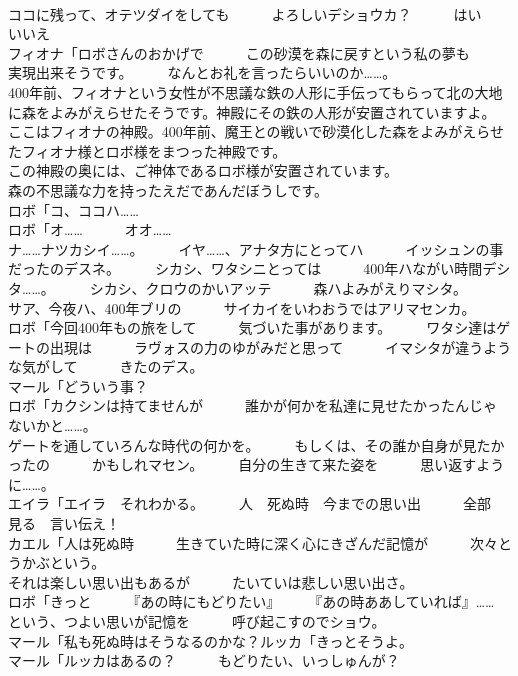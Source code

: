 \documentclass[8pt]{extreport}
\begin{document}
\begin{CJK}{UTF8}{min}
\\	ココに残って、オテツダイをしても　　　よろしいデショウカ？　　　はい　　　いいえ	
\\	フィオナ「ロボさんのおかげで　　　この砂漠を森に戻すという私の夢も　　　実現出来そうです。　　　なんとお礼を言ったらいいのか……。	
\\	400年前、フィオナという女性が不思議な鉄の人形に手伝ってもらって北の大地に森をよみがえらせたそうです。神殿にその鉄の人形が安置されていますよ。	
\\	ここはフィオナの神殿。400年前、魔王との戦いで砂漠化した森をよみがえらせたフィオナ様とロボ様をまつった神殿です。	
\\	この神殿の奥には、ご神体であるロボ様が安置されています。	
\\	森の不思議な力を持ったえだであんだぼうしです。	
\\	ロボ「コ、ココハ……	
\\	ロボ「オ……　　　オオ……　　　
\\	ナ……ナツカシイ……。　　　イヤ……、アナタ方にとってハ　　　イッシュンの事だったのデスネ。　　　シカシ、ワタシニとっては　　　400年ハながい時間デシタ……。　　　シカシ、クロウのかいアッテ　　　森ハよみがえりマシタ。	
\\	サア、今夜ハ、400年ブリの　　　サイカイをいわおうではアリマセンカ。	
\\	ロボ「今回400年もの旅をして　　　気づいた事があります。　　　ワタシ達はゲートの出現は　　　ラヴォスの力のゆがみだと思って　　　イマシタが違うような気がして　　　きたのデス。	
\\	マール「どういう事？	
\\	ロボ「カクシンは持てませんが　　　誰かが何かを私達に見せたかったんじゃ　　　ないかと……。	
\\	ゲートを通していろんな時代の何かを。　　　もしくは、その誰か自身が見たかったの　　　かもしれマセン。　　　自分の生きて来た姿を　　　思い返すように……。	
\\	エイラ「エイラ　それわかる。　　　人　死ぬ時　今までの思い出　　　全部　見る　言い伝え！	
\\	カエル「人は死ぬ時　　　生きていた時に深く心にきざんだ記憶が　　　次々とうかぶという。	
\\	それは楽しい思い出もあるが　　　たいていは悲しい思い出さ。	
\\	ロボ「きっと　　　『あの時にもどりたい』　　　『あの時ああしていれば』……　　　という、つよい思いが記憶を　　　呼び起こすのでショウ。	
\\	マール「私も死ぬ時はそうなるのかな？ルッカ「きっとそうよ。	
\\	マール「ルッカはあるの？　　　もどりたい、いっしゅんが？	

\end{CJK}
\end{document}

